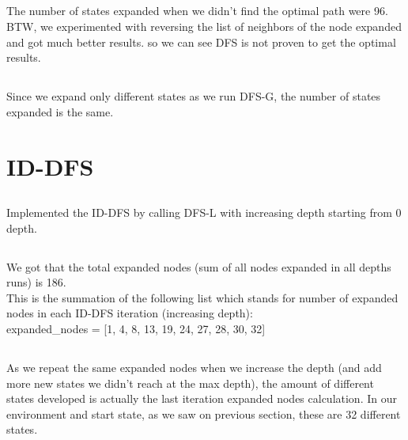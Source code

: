 \documentclass[12pt]{article}
\begin{document}
\subsection{}
The number of states expanded when we didn't find the optimal path were 96.\\
BTW, we experimented with reversing the list of neighbors of the node expanded and got much better results. so we can see DFS is not proven to get the optimal results.

\subsection{}
Since we expand only different states as we run DFS-G, the number of states expanded is the same.

\section{ID-DFS}
\subsection{}
Implemented the ID-DFS by calling DFS-L with increasing depth starting from 0 depth.

\subsection{}
We got that the total expanded nodes (sum of all nodes expanded in all depths runs) is 186.\\
This is the summation of the following list which stands for number of expanded nodes in each ID-DFS iteration (increasing depth):\\
expanded\_nodes = [1, 4, 8, 13, 19, 24, 27, 28, 30, 32]

\subsection{}

As we repeat the same expanded nodes when we increase the depth (and add more new states we didn't reach at the max depth), the amount of different states developed is actually the last iteration expanded nodes calculation. In our environment and start state, as we saw on previous section, these are 32 different states.

\subsection{}
\end{document}
